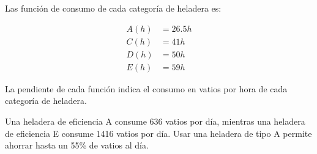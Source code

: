 Las función de consumo de cada categoría de heladera es:

\begin{align*}
    A(h) & = 26.5h \\
    C(h) & = 41h   \\
    D(h) & = 50h   \\
    E(h) & = 59h
\end{align*}

La pendiente de cada función indica el consumo en vatios por hora de cada categoría de heladera.

Una heladera de eficiencia A consume 636 vatios por día, mientras una heladera de eficiencia E consume 1416 vatios por día. Usar una heladera de tipo A permite ahorrar hasta un 55\% de vatios al día.

